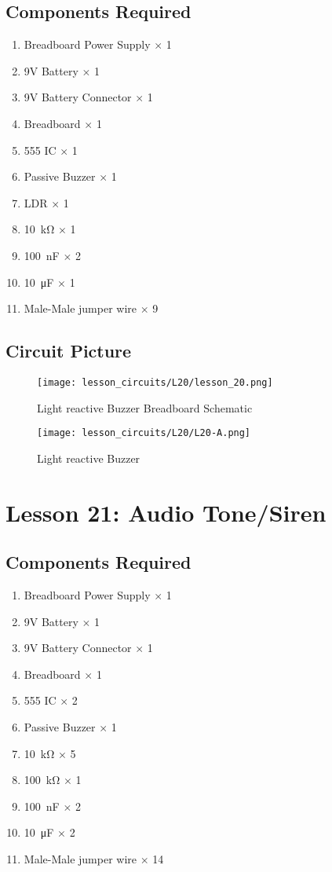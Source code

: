\subsection{Components Required}
\begin{enumerate}
    \item Breadboard Power Supply $\times$ 1
    \item 9V Battery $\times$ 1
    \item 9V Battery Connector $\times$ 1
    \item Breadboard $\times$ 1
    \item 555 IC $\times$ 1
    \item Passive Buzzer $\times$ 1
    \item LDR $\times$ 1
    \item \SI{10}{\kilo\ohm} $\times$ 1
    \item \SI{100}{\nano\farad} $\times$ 2
    \item \SI{10}{\micro\farad} $\times$ 1
    \item Male-Male jumper wire $\times$ 9
\end{enumerate}
\subsection{Circuit Picture}
\begin{figure}[!h]
    \centering
    \texttt{[image: lesson\_circuits/L20/lesson\_20.png]}
    \caption{Light reactive Buzzer Breadboard Schematic}
    \label{fig:555_ldrbuzz_sch}
\end{figure}
\begin{figure}[!h]
    \centering
    \texttt{[image: lesson\_circuits/L20/L20-A.png]}
    \caption{Light reactive Buzzer}
    \label{fig:555_ldrbuzz_obb}
\end{figure}
\section{Lesson 21: Audio Tone/Siren}
\subsection{Components Required}
\begin{enumerate}
    \item Breadboard Power Supply $\times$ 1
    \item 9V Battery $\times$ 1
    \item 9V Battery Connector $\times$ 1
    \item Breadboard $\times$ 1
    \item 555 IC $\times$ 2
    \item Passive Buzzer $\times$ 1
    \item \SI{10}{\kilo\ohm} $\times$ 5
    \item \SI{100}{\kilo\ohm} $\times$ 1
    \item \SI{100}{\nano\farad} $\times$ 2
    \item \SI{10}{\micro\farad} $\times$ 2
    \item Male-Male jumper wire $\times$ 14
\end{enumerate}
